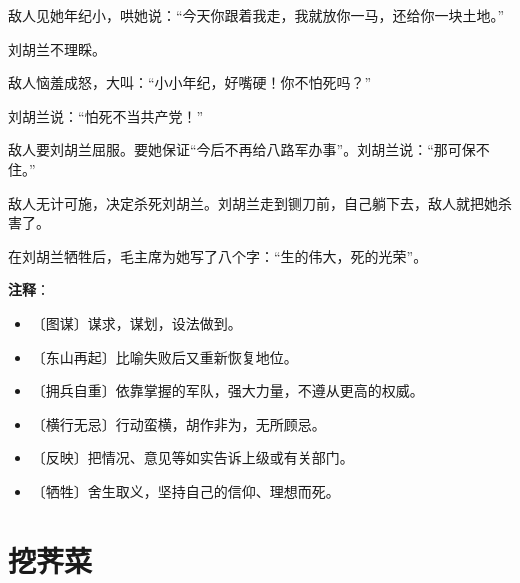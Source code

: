 \documentclass[12pt,UTF-8,openany]{ctexbook}
\begin{document}
\begin{large}
    敌人见她年纪小，哄她说：“今天你跟着我走，我就放你一马，还给你一块土地。”
    
    刘胡兰不理睬。
    
    敌人恼羞成怒，大叫：“小小年纪，好嘴硬！你不怕死吗？”
    
    刘胡兰说：“怕死不当共产党！”
    
    敌人要刘胡兰屈服。要她保证“今后不再给八路军办事”。刘胡兰说：“那可保不住。”
    
    敌人无计可施，决定杀死刘胡兰。刘胡兰走到铡刀前，自己躺下去，敌人就把她杀害了。
    
    在刘胡兰牺牲后，毛主席为她写了八个字：“生的伟大，死的光荣”。
    
\end{large}


\newpage

\textbf{注释}：

\vspace{-1em}

\begin{itemize}
    \setlength\itemsep{-0.2em}
    \item 〔图谋〕谋求，谋划，设法做到。
    \item 〔东山再起〕比喻失败后又重新恢复地位。
    \item 〔拥兵自重〕依靠掌握的军队，强大力量，不遵从更高的权威。
    \item 〔横行无忌〕行动蛮横，胡作非为，无所顾忌。
    \item 〔反映〕把情况、意见等如实告诉上级或有关部门。
    \item 〔牺牲〕舍生取义，坚持自己的信仰、理想而死。
\end{itemize}

\chapter{挖荠菜}
\end{document}
